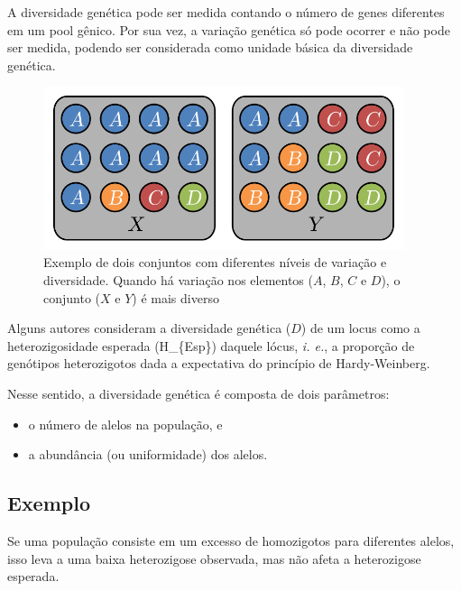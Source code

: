 \documentclass[
]{book}
\begin{document}
A diversidade genética pode ser medida contando o número de genes diferentes em um pool gênico. Por sua vez, a variação genética só pode ocorrer e não pode ser medida, podendo ser considerada como unidade básica da diversidade genética.

\begin{figure}

{\centering \includegraphics[width=400px]{figs/setZ_ABCD} 

}

\caption{Exemplo de dois conjuntos com diferentes níveis de variação e diversidade. Quando há variação nos elementos ($A$, $B$, $C$ e $D$), o conjunto ($X$ e $Y$) é mais diverso}\label{fig:setXeY}
\end{figure}

Alguns autores consideram a diversidade genética (\(D\)) de um locus como a heterozigosidade esperada (H\_\{Esp\}) daquele lócus, \emph{i. e.}, a proporção de genótipos heterozigotos dada a expectativa do princípio de Hardy-Weinberg.

Nesse sentido, a diversidade genética é composta de dois parâmetros:

\begin{itemize}
\item
  o número de alelos na população, e
\item
  a abundância (ou uniformidade) dos alelos.
\end{itemize}

\hypertarget{exemplo}{%
\subsection{Exemplo}\label{exemplo}}

Se uma população consiste em um excesso de homozigotos para diferentes alelos, isso leva a uma baixa heterozigose observada, mas não afeta a heterozigose esperada.
\end{document}
